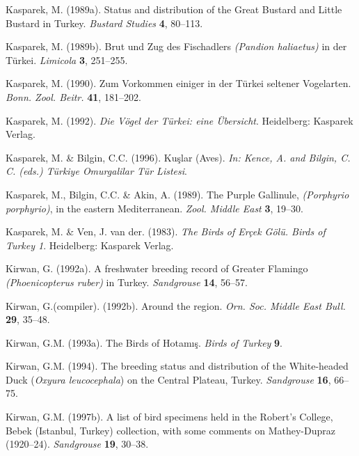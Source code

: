 \documentclass[
  a4paper,
  DIV=11,
  numbers=noendperiod]{scrreprt}
\newlength{\cslhangindent}
\newenvironment{CSLReferences}[2] %
 {\begin{list}{}{%
  \setlength{\itemindent}{0pt}
  \setlength{\leftmargin}{0pt}
  \setlength{\parsep}{0pt}
  \ifodd #1
   \setlength{\leftmargin}{\cslhangindent}
   \setlength{\itemindent}{-1\cslhangindent}
  \fi
  \setlength{\itemsep}{#2\baselineskip}}}
 {\end{list}}
\begin{document}
\begin{CSLReferences}{1}{1}
Kasparek, M. (1989a). {Status and distribution of the Great Bustard and
Little Bustard in Turkey}. \emph{Bustard Studies} \textbf{4}, 80--113.

Kasparek, M. (1989b). {Brut und Zug des Fischadlers \emph{(Pandion
haliaetus)} in der Türkei}. \emph{Limicola} \textbf{3}, 251--255.

Kasparek, M. (1990). {Zum Vorkommen einiger in der Türkei seltener
Vogelarten}. \emph{Bonn. Zool. Beitr.} \textbf{41}, 181--202.

Kasparek, M. (1992). \emph{{Die Vögel der Türkei: eine Übersicht}}.
Heidelberg: Kasparek Verlag.

Kasparek, M. \& Bilgin, C.C. (1996). {Kuşlar (Aves)}. \emph{In: Kence,
A. and Bilgin, C. C. (eds.) Türkiye Omurgalilar Tür Listesi}.

Kasparek, M., Bilgin, C.C. \& Akin, A. (1989). {The Purple Gallinule,
\emph{(Porphyrio porphyrio)}, in the eastern Mediterranean}. \emph{Zool.
Middle East} \textbf{3}, 19--30.

Kasparek, M. \& Ven, J. van der. (1983). \emph{{The Birds of Erçek Gölü.
Birds of Turkey 1}}. Heidelberg: Kasparek Verlag.

Kirwan, G. (1992a). {A freshwater breeding record of Greater Flamingo
\emph{(Phoenicopterus ruber)} in Turkey}. \emph{Sandgrouse} \textbf{14},
56--57.

Kirwan, G.(compiler). (1992b). {Around the region}. \emph{Orn. Soc.
Middle East Bull.} \textbf{29}, 35--48.

Kirwan, G.M. (1993a). {The Birds of Hotamış}. \emph{Birds of Turkey}
\textbf{9}.

Kirwan, G.M. (1994). {The breeding status and distribution of the
White-headed Duck (\emph{Oxyura leucocephala}) on the Central Plateau,
Turkey}. \emph{Sandgrouse} \textbf{16}, 66--75.

Kirwan, G.M. (1997b). {A list of bird specimens held in the Robert's
College, Bebek (Istanbul, Turkey) collection, with some comments on
Mathey-Dupraz (1920--24)}. \emph{Sandgrouse} \textbf{19}, 30--38.


\end{CSLReferences}
\end{document}
